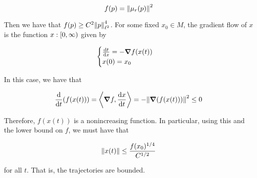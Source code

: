 \documentclass{article}
\begin{document}
\[f(p) = \norm{\mu_r(p)}^2\]

Then we have that \(f(p) \ge C^2\norm{p}_{\ell^2}^4\). For some fixed \(x_0 \in M\), the gradient flow of \(x\) is the function \(x : [0, \infty)\) given by

\[\begin{cases}
    \dv{t}{x} = -\grad f(x(t)) \\
    x(0) = x_0
\end{cases}\]

In this case, we have that

\[\dv{t}(f(x(t))) = \left\langle \grad f, \dv{x}{t} \right\rangle = -\norm{\grad(f(x(t)))}^2 \le 0\]

Therefore, \(f(x(t))\) is a nonincreasing function. In particular, using this and the lower bound on \(f\), we must have that

\[\norm{x(t)} \le \frac{f(x_0)^{1/4}}{C^{1/2}}\]

for all \(t\). That is, the trajectories are bounded.

\printbibliography
\end{document}
